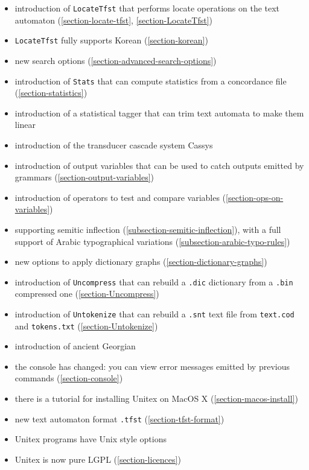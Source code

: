 \begin{itemize}
  \item introduction of \verb$LocateTfst$ that performs locate operations
        on the text automaton (\ref{section-locate-tfst}, \ref{section-LocateTfst})
  \item \verb$LocateTfst$ fully supports Korean (\ref{section-korean})
  \item new search options (\ref{section-advanced-search-options})
  \item introduction of \verb$Stats$ that can compute statistics from a
        concordance file (\ref{section-statistics})
  \item introduction of a statistical tagger that can trim text automata to make them
        linear
  \item introduction of the transducer cascade system Cassys
  \item introduction of output variables that can be used to catch outputs emitted
        by grammars (\ref{section-output-variables})
  \item introduction of operators to test and compare variables (\ref{section-ops-on-variables})
  \item supporting semitic inflection (\ref{subsection-semitic-inflection}), with a full support 
        of Arabic typographical variations (\ref{subsection-arabic-typo-rules})
  \item new options to apply dictionary graphs (\ref{section-dictionary-graphs}) 
  \item introduction of \verb$Uncompress$ that can rebuild a \verb$.dic$
        dictionary from a \verb$.bin$ compressed one (\ref{section-Uncompress})
  \item introduction of \verb$Untokenize$ that can rebuild a \verb$.snt$
        text file from \verb$text.cod$ and \verb$tokens.txt$ (\ref{section-Untokenize})
  \item introduction of ancient Georgian
  \item the console has changed: you can view error messages emitted by
        previous commands (\ref{section-console})
  \item there is a tutorial for installing Unitex on MacOS X 
       (\ref{section-macos-install})
  \item new text automaton format \verb+.tfst+ (\ref{section-tfst-format})          
  \item Unitex programs have Unix style options
  \item Unitex is now pure LGPL (\ref{section-licences})

\end{itemize}
